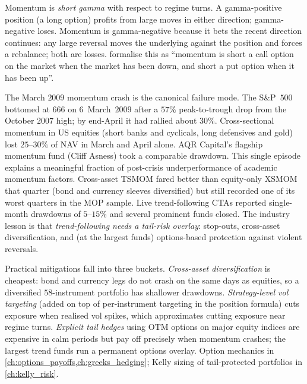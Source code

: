 Momentum is \emph{short gamma} with respect to regime turns. A
gamma-positive position (a long option) profits from large moves
in either direction; gamma-negative loses. Momentum is
gamma-negative because it bets the recent direction continues:
any large reversal moves the underlying against the position and
forces a rebalance; both are losses. \citet{daniel2016momentum}
formalise this as ``momentum is short a call option on the market
when the market has been down, and short a put option when it has
been up''.

\begin{historybox}
\label{hist:march2009}
The March $2009$ momentum crash is the canonical failure mode.
The S\&P~$500$ bottomed at $666$ on $6$~March~$2009$ after a $57\%$
peak-to-trough drop from the October $2007$ high; by end-April it
had rallied about $30\%$. Cross-sectional momentum in US equities
(short banks and cyclicals, long defensives and gold) lost
$25$--$30\%$ of NAV in March and April alone. AQR Capital's
flagship momentum fund (Cliff Asness) took a comparable drawdown.
This single episode explains a meaningful fraction of post-crisis
underperformance of academic momentum factors. Cross-asset TSMOM fared better than
equity-only XSMOM that quarter (bond and currency sleeves
diversified) but still recorded one of its worst quarters in
the MOP sample. Live trend-following CTAs reported single-month
drawdowns of $5$--$15\%$ and several prominent funds closed. The
industry lesson is that \emph{trend-following needs a tail-risk
overlay}: stop-outs, cross-asset diversification, and (at the
largest funds) options-based protection against violent reversals.
\end{historybox}

Practical mitigations fall into three buckets. \emph{Cross-asset
diversification} is cheapest: bond and currency legs do not crash
on the same days as equities, so a diversified $58$-instrument
portfolio has shallower drawdowns. \emph{Strategy-level vol
targeting} (added on top of per-instrument targeting in the
position formula) cuts exposure when realised vol spikes, which
approximates cutting exposure near regime turns. \emph{Explicit
tail hedges} using OTM options on major equity indices are
expensive in calm periods but pay off precisely when momentum
crashes; the largest trend funds run a permanent options overlay.
Option mechanics in \cref{ch:options_payoffs,ch:greeks_hedging};
Kelly sizing of tail-protected portfolios in \cref{ch:kelly_risk}.

